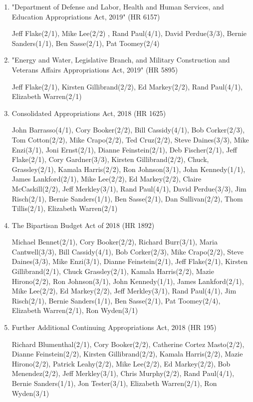\documentclass[11pt,twocolumn]{article}
\begin{document}
\begin{enumerate}
\item
"Department of Defense and Labor, Health and Human Services, and Education Appropriations Act, 2019" (HR 6157)

Jeff Flake(2/1), Mike Lee(2/2) , Rand Paul(4/1), David Perdue(3/3), Bernie Sanders(1/1), Ben Sasse(2/1), Pat Toomey(2/4)

\item
"Energy and Water, Legislative Branch, and Military Construction and Veterans Affairs Appropriations Act, 2019" (HR 5895)

Jeff Flake(2/1), Kirsten Gillibrand(2/2), Ed Markey(2/2), Rand Paul(4/1), Elizabeth Warren(2/1)

\item
Consolidated Appropriations Act, 2018 (HR 1625)

John Barrasso(4/1), Cory Booker(2/2), Bill Cassidy(4/1), Bob Corker(2/3), Tom Cotton(2/2), Mike Crapo(2/2), Ted Cruz(2/2), Steve Daines(3/3), Mike Enzi(3/1), Joni Ernst(2/1), Dianne Feinstein(2/1), Deb Fischer(2/1), Jeff Flake(2/1), Cory Gardner(3/3), Kirsten Gillibrand(2/2), Chuck, Grassley(2/1), Kamala Harris(2/2), Ron Johnson(3/1), John Kennedy(1/1), James Lankford(2/1), Mike Lee(2/2), Ed Markey(2/2), Claire McCaskill(2/2), Jeff Merkley(3/1), Rand Paul(4/1), David Perdue(3/3), Jim Risch(2/1), Bernie Sanders(1/1), Ben Sasse(2/1), Dan Sullivan(2/2), Thom Tillis(2/1), Elizabeth Warren(2/1)

\item
The Bipartisan Budget Act of 2018 (HR 1892)

Michael Bennet(2/1), Cory Booker(2/2), Richard Burr(3/1), Maria Cantwell(3/3), Bill Cassidy(4/1), Bob Corker(2/3), Mike Crapo(2/2), Steve Daines(3/3), Mike Enzi(3/1), Dianne Feinstein(2/1), Jeff Flake(2/1), Kirsten Gillibrand(2/1), Chuck Grassley(2/1), Kamala Harris(2/2), Mazie Hirono(2/2), Ron Johnson(3/1), John Kennedy(1/1), James Lankford(2/1), Mike Lee(2/2), Ed Markey(2/2), Jeff Merkley(3/1), Rand Paul(4/1), Jim Risch(2/1), Bernie Sanders(1/1), Ben Sasse(2/1), Pat Toomey(2/4), Elizabeth Warren(2/1), Ron Wyden(3/1)

\item
Further Additional Continuing Appropriations Act, 2018 (HR 195)

Richard Blumenthal(2/1), Cory Booker(2/2), Catherine Cortez Masto(2/2), Dianne Feinstein(2/2), Kirsten Gillibrand(2/2), Kamala Harris(2/2), Mazie Hirono(2/2), Patrick Leahy(2/2), Mike Lee(2/2), Ed Markey(2/2), Bob Menendez(2/2), Jeff Merkley(3/1), Chris Murphy(2/2), Rand Paul(4/1), Bernie Sanders(1/1), Jon Tester(3/1), Elizabeth Warren(2/1), Ron Wyden(3/1)


\end{enumerate}
\end{document}
